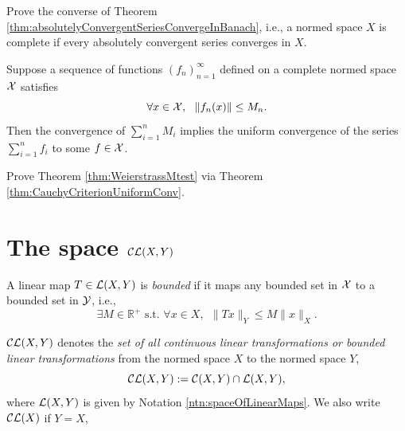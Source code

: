 \begin{exc}
  Prove the converse of Theorem
  \ref{thm:absolutelyConvergentSeriesConvergeInBanach},
  i.e., a normed space $X$ is complete
  if every absolutely convergent series converges in $X$.
\end{exc}

\begin{thm}
  \label{thm:WeierstrassMtest}
  Suppose a sequence of functions $(f_n)_{n=1}^{\infty}$ 
  defined on a complete normed space ${\cal X}$ satisfies
  \begin{equation}
    \label{eq:WeierstrassMtest}
    \forall x\in{\cal X},\ \ \|f_n(x)\|\le M_n.
  \end{equation}
  Then the convergence of $\sum_{i=1}^n M_i$ 
  implies the uniform convergence of the series $\sum_{i=1}^n f_i$ 
  to some  $f\in{\cal X}$.
\end{thm}

\begin{exc}
  Prove Theorem \ref{thm:WeierstrassMtest}
  via Theorem \ref{thm:CauchyCriterionUniformConv}. 
\end{exc}

\section{The space ${\cal CL}(X,Y)$}
\label{sec:space-CLXY}

\begin{defn}
  \label{def:boundedLinearMap}
  A linear map $T\in {\cal L}(X,Y)$ is \emph{bounded} if
  it maps any bounded set in ${\cal X}$
  to a bounded set in ${\cal Y}$, i.e., 
  \begin{equation}
    \label{eq:boundedLinearMap}
    \exists M\in \mathbb{R}^+ \text{ s.t. }
    \forall x\in X,\ \  \|Tx\|_Y\le M \|x\|_X.
  \end{equation}
\end{defn}

\begin{ntn}
  ${\cal C}{\cal L}(X,Y)$ denotes
  the \emph{set of all continuous linear transformations
  or bounded linear transformations}
  from the normed space $X$ to the normed space $Y$,
  \begin{equation}
    \label{eq:CL-XY}
    {\cal CL}(X,Y) := {\cal C}(X,Y) \cap {\cal L}(X,Y),
  \end{equation}
  where ${\cal L}(X,Y)$ is given by Notation \ref{ntn:spaceOfLinearMaps}.
  We also write ${\cal CL}(X)$ if $Y=X$, 
\end{ntn}

